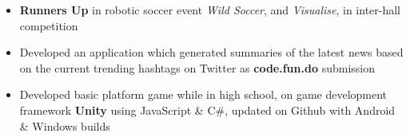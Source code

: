 
\begin{itemize}
  \item \textbf{Runners Up} in robotic soccer event \emph{Wild Soccer}, and \emph{Visualise}, in inter-hall competition
  \item Developed an application which generated summaries of the latest news based on the current trending hashtags on Twitter as \textbf{code.fun.do} submission
  \item Developed basic platform game while in high school, on game development framework \textbf{Unity} using JavaScript \& C\#, updated on Github with Android \& Windows builds
    \vspace{-1mm}
\end{itemize}